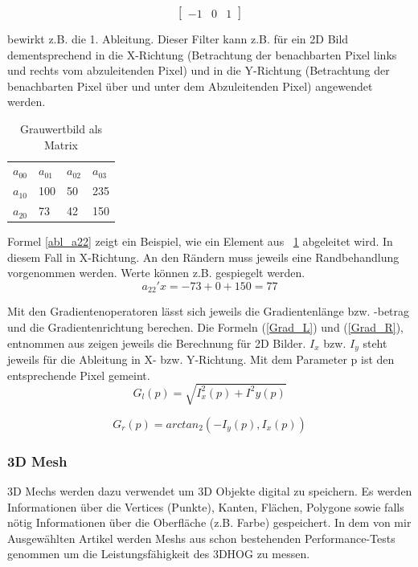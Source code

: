 \begin{equation}
\label{Abl_Maske}
\begin{bmatrix}
-1 & 0 & 1
\end{bmatrix}
\end{equation}

bewirkt z.B. die 1. Ableitung. Dieser Filter kann z.B. für ein 2D Bild dementsprechend in die X-Richtung (Betrachtung der benachbarten Pixel links und rechts vom abzuleitenden Pixel) und in die Y-Richtung (Betrachtung der benachbarten Pixel über und unter dem Abzuleitenden Pixel) angewendet werden.  

\begin{table}[]
	\centering
	\caption{Grauwertbild als Matrix}
	\label{GrauwertMat}
	\begin{tabular}{llll}
		$a_{00}$ & $a_{01}$ & $a_{02}$ & $a_{03}$ \\
		$a_{10}$ & 100    & 50     & 235     \\
		$a_{20}$ & 73     & 42     & 150      \\
	\end{tabular}
\end{table}

Formel \ref{abl_a22} zeigt ein Beispiel, wie ein Element aus \tablename~\ref{GrauwertMat} abgeleitet wird. In diesem Fall in X-Richtung. An den Rändern muss jeweils eine Randbehandlung vorgenommen werden. Werte können z.B. gespiegelt werden.
\begin{equation}
\label{abl_a22}
a_{22}'x = -73 + 0 +150 = 77
\end{equation}

Mit den Gradientenoperatoren lässt sich jeweils die Gradientenlänge bzw. -betrag und die Gradientenrichtung berechen. Die Formeln (\ref{Grad_L}) und (\ref{Grad_R}), entnommen aus \cite{Priese15} zeigen jeweils die Berechnung für 2D Bilder. $I_x$ bzw. $I_y$ steht jeweils für die Ableitung in X- bzw. Y-Richtung. Mit dem Parameter p ist den entsprechende Pixel gemeint.
\begin{equation}
\label{Grad_L}
G_l(p) = \sqrt{I^2_x(p)+ I^2 y(p)}
\end{equation}

\begin{equation}
\label{Grad_R}
G_r(p) = arctan_2(- I_y(p),I_x(p))
\end{equation}


\subsubsection{3D Mesh}
3D Mechs werden dazu verwendet um 3D Objekte digital zu speichern. Es werden Informationen über die Vertices (Punkte), Kanten, Flächen, Polygone sowie falls nötig Informationen über die Oberfläche (z.B. Farbe) gespeichert. In dem von mir Ausgewählten Artikel \cite{scherer2010histograms} werden Meshs aus schon bestehenden Performance-Tests genommen um die Leistungsfähigkeit des 3DHOG zu messen.